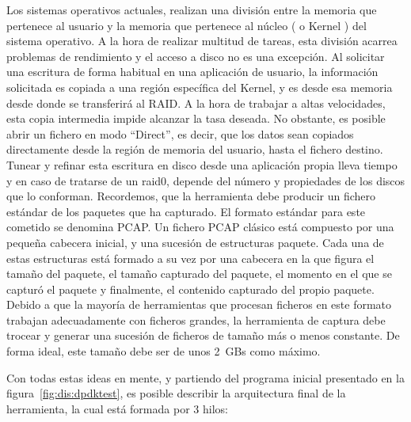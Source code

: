 Los sistemas operativos actuales, realizan una división entre la memoria que pertenece al usuario y la memoria que pertenece al núcleo ( o Kernel ) del sistema operativo. A la hora de realizar multitud de tareas, esta división acarrea problemas de rendimiento y el acceso a disco no es una excepción. Al solicitar una escritura de forma habitual en una aplicación de usuario, la información solicitada es copiada a una región específica del Kernel, y es desde esa memoria desde donde se transferirá al RAID. A la hora de trabajar a altas velocidades, esta copia intermedia impide alcanzar la tasa deseada. No obstante, es posible abrir un fichero en modo ``Direct'', es decir, que los datos sean copiados directamente desde la región de memoria del usuario, hasta el fichero destino. Tunear y refinar esta escritura en disco desde una aplicación propia lleva tiempo y en caso de tratarse de un \gls{raid0}, depende del número y propiedades de los discos que lo conforman.
Recordemos, que la herramienta debe producir un fichero estándar de los paquetes que ha capturado. El formato estándar para este cometido se denomina PCAP. Un fichero PCAP clásico está compuesto por una pequeña cabecera inicial, y una sucesión de estructuras paquete. Cada una de estas estructuras está formado a su vez por una cabecera en la que figura el tamaño del paquete, el tamaño capturado del paquete, el momento en el que se capturó el paquete y finalmente, el contenido capturado del propio paquete. Debido a que la mayoría de herramientas que procesan ficheros en este formato trabajan adecuadamente con ficheros grandes, la herramienta de captura debe trocear y generar una sucesión de ficheros de tamaño más o menos constante. De forma ideal, este tamaño debe ser de unos 2~GBs como máximo.

\newpage
Con todas estas ideas en mente, y partiendo del programa inicial presentado en la figura~\ref{fig:dis:dpdktest}, es posible describir la arquitectura final de la herramienta, la cual está formada por 3 hilos:

